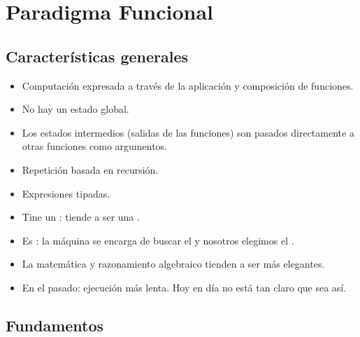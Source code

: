 \section{Paradigma Funcional}

\subsection{Características generales}

\begin{itemize}
  \item Computación expresada a través de la aplicación y composición de funciones.
  \item No hay un estado global.
  \item Los estados intermedios (salidas de las funciones) son pasados directamente a otras funciones como argumentos.
  \item Repetición basada en recursión.
  \item Expresiones tipadas.
  \item Tine un : tiende a ser una .
  \item Es : la máquina se encarga de buscar el  y nosotros elegimos el .
  \item La matemática y razonamiento algebraico tienden a ser más elegantes.
  \item En el pasado: ejecución más lenta. Hoy en día no está tan claro que sea así.
\end{itemize}

\subsection{Fundamentos}

